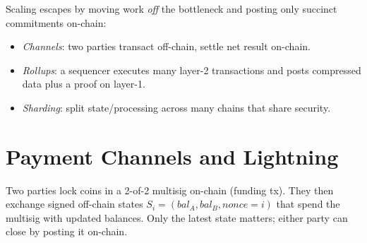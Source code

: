 Scaling escapes by moving work \emph{off} the bottleneck and posting only succinct commitments on-chain:
\begin{itemize}[leftmargin=1.2em]
    \item \emph{Channels}: two parties transact off-chain, settle net result on-chain.
    \item \emph{Rollups}: a sequencer executes many layer-2 transactions and posts compressed data plus a proof on layer-1.
    \item \emph{Sharding}: split state/processing across many chains that share security.
\end{itemize}

\section{Payment Channels and Lightning}\label{sec:channels}
Two parties lock coins in a 2-of-2 multisig on-chain (funding tx). They then exchange signed off-chain states $S_i=(bal_A, bal_B, nonce=i)$ that spend the multisig with updated balances. Only the latest state matters; either party can close by posting it on-chain.

